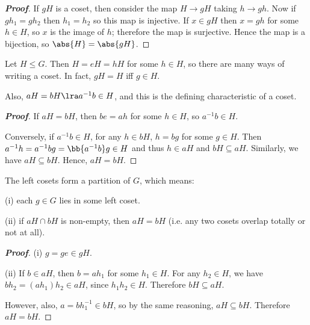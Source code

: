 \begin{proof}[\bf Proof]
If $gH$ is a coset, then consider the map $H\to gH$ taking $h\to gh$. Now if $gh_1 = gh_2$ then $h_1 = h_2$ so this map is injective. If $x \in gH$ then $x = gh$ for some $h\in H$, so $x$ is the image of $h$; therefore the map is surjective. Hence the map is a bijection, so $\abs{H} = \abs{gH}$.
\end{proof}

\begin{theorem}\label{thm:left_coset}
Let $H\leq G$. Then $H = eH = h H$ for some $h\in H$, so there are many ways of writing a coset. In fact, $gH = H$ iff $g\in H$.

Also, $aH = bH \lra a^{-1}b\in H$, and this is the defining characteristic of a coset.
\end{theorem}

\begin{proof}[\bf Proof]
If $aH=bH$, then $be = ah$ for some $h\in H$, so $a^{-1}b\in H$.

Conversely, if $a^{-1}b \in H$, for any $h\in bH$, $h = bg$ for some $g \in H$. Then $a^{-1}h = a^{-1}b g = \bb{a^{-1}b}g \in H$ and thus $h\in aH$ and $bH \subseteq aH$. Similarly, we have $aH \subseteq bH$. Hence, $aH = bH$.
\end{proof}


\begin{lemma}\label{lem:left_coset}
The left cosets form a partition of $G$, which means:
\ben
\item [(i)] each $g\in G$ lies in some left coset.
\item [(ii)] if $aH\cap bH$ is non-empty, then $aH = bH$ (i.e. any two cosets overlap totally or not at all).
\een
\end{lemma}

\begin{proof}[\bf Proof]
\ben
\item [(i)] $g=ge \in gH$.
\item [(ii)] If $b\in aH$, then $b=ah_1$ for some $h_1\in H$. For any $h_2\in H$, we have $bh_2 = (ah_1)h_2\in aH$, since $h_1h_2 \in H$. Therefore $bH \subseteq aH$.


However, also, $a= bh_1^{-1}\in bH$, so by the same reasoning, $aH \subseteq bH$. Therefore $aH = bH$.
\een
\end{proof}

